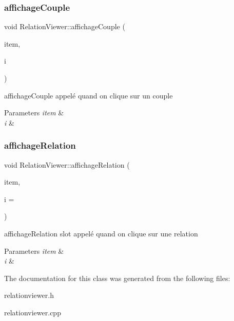 \subsubsection{\texorpdfstring{affichage\+Couple}{affichageCouple}}
{\footnotesize\ttfamily void Relation\+Viewer\+::affichage\+Couple (\begin{DoxyParamCaption}\item[{Q\+Tree\+Widget\+Item $\ast$}]{item,  }\item[{int}]{i }\end{DoxyParamCaption})\hspace{0.3cm}{\ttfamily [slot]}}



affichage\+Couple appelé quand on clique sur un couple 


\begin{DoxyParams}{Parameters}
{\em item} & \\
\hline
{\em i} & \\
\hline
\end{DoxyParams}
\mbox{\label{classRelationViewer_ac357dab8075b96af014ad4dd70a1a7dd}} 
\subsubsection{\texorpdfstring{affichage\+Relation}{affichageRelation}}
{\footnotesize\ttfamily void Relation\+Viewer\+::affichage\+Relation (\begin{DoxyParamCaption}\item[{Q\+Tree\+Widget\+Item $\ast$}]{item,  }\item[{int}]{i = {} }\end{DoxyParamCaption})\hspace{0.3cm}{\ttfamily [slot]}}



affichage\+Relation slot appelé quand on clique sur une relation 


\begin{DoxyParams}{Parameters}
{\em item} & \\
\hline
{\em i} & \\
\hline
\end{DoxyParams}


The documentation for this class was generated from the following files\+:\begin{DoxyCompactItemize}
\item 
relationviewer.\+h\item 
relationviewer.\+cpp\end{DoxyCompactItemize}
